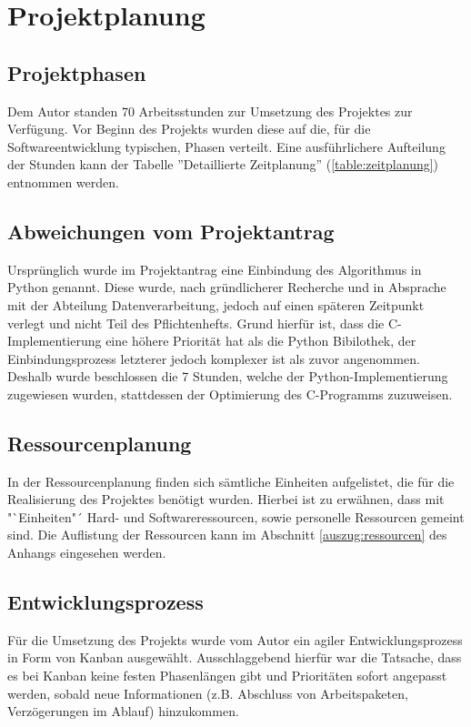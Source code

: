 \section{Projektplanung}
\label{section:projektplanung}
\subsection{Projektphasen}
Dem Autor standen 70 Arbeitsstunden zur Umsetzung des Projektes zur Verfügung.
Vor Beginn des Projekts wurden diese auf die, für die Softwareentwicklung
typischen, Phasen verteilt. Eine ausführlichere Aufteilung der Stunden kann der Tabelle
''Detaillierte Zeitplanung'' (\ref{table:zeitplanung}) entnommen werden.



\subsection{Abweichungen vom Projektantrag}
Ursprünglich wurde im Projektantrag eine Einbindung des Algorithmus in
Python genannt. Diese wurde, nach gründlicherer Recherche und in Absprache mit der
Abteilung Datenverarbeitung, jedoch auf einen späteren Zeitpunkt verlegt und nicht
Teil des Pflichtenhefts. Grund hierfür ist, dass die C-Implementierung eine höhere
Priorität hat als die Python Bibilothek, der Einbindungsprozess letzterer jedoch komplexer
ist als zuvor angenommen.
Deshalb wurde beschlossen die 7 Stunden, welche der Python-Implementierung
zugewiesen wurden, stattdessen der Optimierung des C-Programms zuzuweisen.

\subsection{Ressourcenplanung}
In der Ressourcenplanung finden sich sämtliche Einheiten aufgelistet, die für
 die Realisierung des Projektes benötigt wurden. Hierbei ist zu erwähnen, dass mit "`Einheiten"´ Hard- und Softwareressourcen, sowie personelle Ressourcen gemeint sind.
 Die Auflistung der Ressourcen kann im Abschnitt \ref{auszug:ressourcen} des Anhangs eingesehen werden.

\subsection{Entwicklungsprozess}
Für die Umsetzung des Projekts wurde vom Autor ein agiler Entwicklungsprozess in
Form von Kanban ausgewählt. Ausschlaggebend hierfür war die Tatsache, dass es bei Kanban
keine festen Phasenlängen gibt und Prioritäten sofort angepasst werden, sobald
neue Informationen (z.B. Abschluss von Arbeitspaketen, Verzögerungen im Ablauf) hinzukommen.\par

